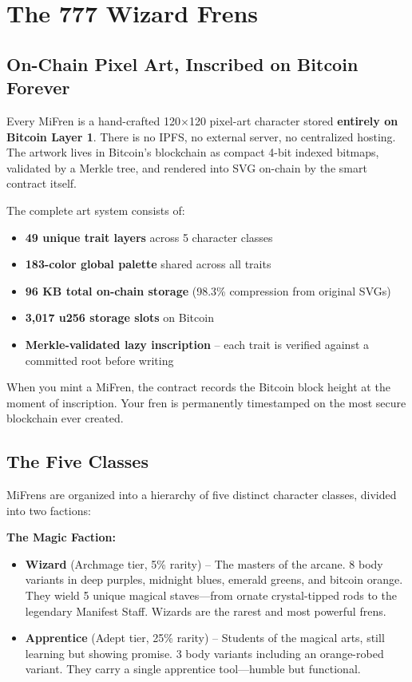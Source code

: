 \documentclass[11pt,a4paper]{article}
\begin{document}
\section{The 777 Wizard Frens}

\subsection{On-Chain Pixel Art, Inscribed on Bitcoin Forever}

Every MiFren is a hand-crafted 120$\times$120 pixel-art character stored \textbf{entirely on Bitcoin Layer 1}. There is no IPFS, no external server, no centralized hosting. The artwork lives in Bitcoin's blockchain as compact 4-bit indexed bitmaps, validated by a Merkle tree, and rendered into SVG on-chain by the smart contract itself.

The complete art system consists of:

\begin{itemize}
    \item \textbf{49 unique trait layers} across 5 character classes
    \item \textbf{183-color global palette} shared across all traits
    \item \textbf{96 KB total on-chain storage} (98.3\% compression from original SVGs)
    \item \textbf{3,017 u256 storage slots} on Bitcoin
    \item \textbf{Merkle-validated lazy inscription} -- each trait is verified against a committed root before writing
\end{itemize}

When you mint a MiFren, the contract records the Bitcoin block height at the moment of inscription. Your fren is permanently timestamped on the most secure blockchain ever created.

\subsection{The Five Classes}

MiFrens are organized into a hierarchy of five distinct character classes, divided into two factions:

\textbf{The Magic Faction:}
\begin{itemize}
    \item \textbf{Wizard} (Archmage tier, 5\% rarity) -- The masters of the arcane. 8 body variants in deep purples, midnight blues, emerald greens, and bitcoin orange. They wield 5 unique magical staves---from ornate crystal-tipped rods to the legendary Manifest Staff. Wizards are the rarest and most powerful frens.
    \item \textbf{Apprentice} (Adept tier, 25\% rarity) -- Students of the magical arts, still learning but showing promise. 3 body variants including an orange-robed variant. They carry a single apprentice tool---humble but functional.
\end{itemize}
\end{document}
